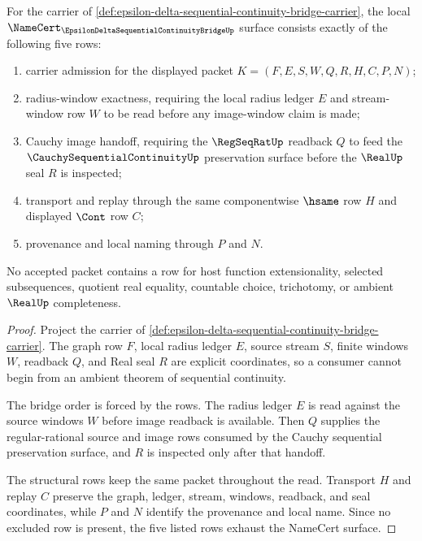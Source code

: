 \begin{theorem}
\label{thm:epsilon-delta-sequential-continuity-bridge-obligations}
For the carrier of \autoref{def:epsilon-delta-sequential-continuity-bridge-carrier}, the local $\NameCert_{\EpsilonDeltaSequentialContinuityBridgeUp}$ surface consists exactly of the following five rows:
\begin{enumerate}
\item carrier admission for the displayed packet $K=(F,E,S,W,Q,R,H,C,P,N)$;
\item radius-window exactness, requiring the local radius ledger $E$ and stream-window row $W$ to be read before any image-window claim is made;
\item Cauchy image handoff, requiring the $\RegSeqRatUp$ readback $Q$ to feed the $\CauchySequentialContinuityUp$ preservation surface before the $\RealUp$ seal $R$ is inspected;
\item transport and replay through the same componentwise $\hsame$ row $H$ and displayed $\Cont$ row $C$;
\item provenance and local naming through $P$ and $N$.
\end{enumerate}
No accepted packet contains a row for host function extensionality, selected subsequences, quotient real equality, countable choice, trichotomy, or ambient $\RealUp$ completeness.
\end{theorem}
\begin{proof}
Project the carrier of \autoref{def:epsilon-delta-sequential-continuity-bridge-carrier}. The graph row $F$, local radius ledger $E$, source stream $S$, finite windows $W$, readback $Q$, and Real seal $R$ are explicit coordinates, so a consumer cannot begin from an ambient theorem of sequential continuity.

The bridge order is forced by the rows. The radius ledger $E$ is read against the source windows $W$ before image readback is available. Then $Q$ supplies the regular-rational source and image rows consumed by the Cauchy sequential preservation surface, and $R$ is inspected only after that handoff.

The structural rows keep the same packet throughout the read. Transport $H$ and replay $C$ preserve the graph, ledger, stream, windows, readback, and seal coordinates, while $P$ and $N$ identify the provenance and local name. Since no excluded row is present, the five listed rows exhaust the NameCert surface.
\end{proof}

